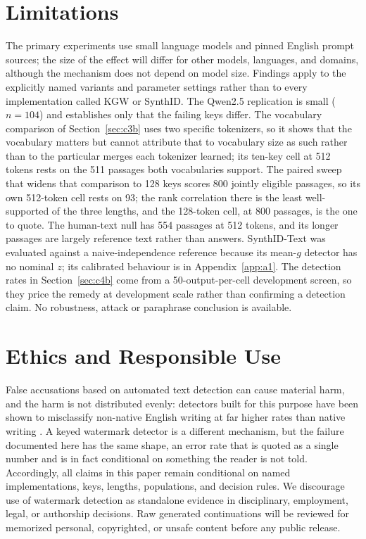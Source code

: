 \documentclass[conference]{IEEEtran}
\begin{document}
\section{Limitations}

The primary experiments use small language models and pinned English prompt
sources; the size of the effect will differ for other models, languages, and
domains, although the mechanism does not depend on model size. Findings apply to
the explicitly named variants and parameter settings rather than to every
implementation called KGW or SynthID. The Qwen2.5 replication is small ($n=104$)
and establishes only that the failing keys differ. The vocabulary comparison of
Section~\ref{sec:c3b} uses two specific tokenizers, so it shows that the
vocabulary matters but cannot attribute that to vocabulary size as such rather
than to the particular merges each tokenizer learned; its ten-key cell at 512
tokens rests on the 511 passages both vocabularies support. The paired sweep that
widens that comparison to 128 keys scores 800 jointly eligible passages, so its
own 512-token cell rests on 93; the rank correlation there is the least
well-supported of the three lengths, and the 128-token cell, at 800 passages, is
the one to quote. The human-text null has 554
passages at 512 tokens, and its longer passages are largely reference text rather
than answers. SynthID-Text was evaluated against a naive-independence reference
because its mean-$g$ detector has no nominal $z$; its calibrated behaviour is in
Appendix~\ref{app:a1}. The detection rates in Section~\ref{sec:c4b} come from a
50-output-per-cell development screen, so they price the remedy at development
scale rather than confirming a detection claim. No robustness, attack or
paraphrase conclusion is available.

\section{Ethics and Responsible Use}

False accusations based on automated text detection can cause material harm, and
the harm is not distributed evenly: detectors built for this purpose have been
shown to misclassify non-native English writing at far higher rates than native
writing \citep{liang2023biased}. A keyed watermark detector is a different
mechanism, but the failure documented here has the same shape, an error rate that
is quoted as a single number and is in fact conditional on something the reader is
not told.
Accordingly, all claims in this paper remain conditional on named implementations,
keys, lengths, populations, and decision rules. We discourage use of watermark
detection as standalone evidence in disciplinary, employment, legal, or authorship
decisions. Raw generated continuations will be reviewed for memorized personal,
copyrighted, or unsafe content before any public release.
\end{document}
